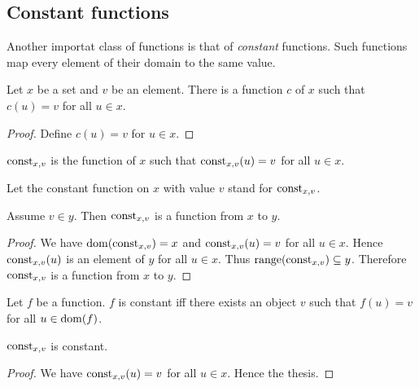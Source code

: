 \documentclass[../../set-theory.ftl.tex]{subfiles}
\begin{document}
  \subsection{Constant functions}

  Another importat class of functions is that of \textit{constant} functions.
  Such functions map every element of their domain to the same value.

  \begin{forthel}
    \begin{lemma}
      Let $x$ be a set and $v$ be an element.
      There is a function $c$ of $x$ such that $c(u) = v$ for all $u \in x$.
    \end{lemma}
    \begin{proof}
      Define $c(u) = v$ for $u \in x$.
    \end{proof}

    \begin{definition}
      $\mbox{const}_{x,v}$ is the function of $x$ such that $\mbox{const}_{x,v}(u) = v$ for all $u \in x$.
    \end{definition}

    Let the constant function on $x$ with value $v$ stand for $\mbox{const}_{x,v}$.

    \begin{proposition}\label{SetTheory_02_01_180417}
      Assume $v \in y$.
      Then $\mbox{const}_{x,v}$ is a function from $x$ to $y$.
    \end{proposition}
    \begin{proof}
      We have $\operatorname{dom}(\mbox{const}_{x,v}) = x$ and $\mbox{const}_{x,v}(u) = v$ for all $u \in x$.
      Hence $\mbox{const}_{x,v}(u)$ is an element of $y$ for all $u \in x$.
      Thus $\operatorname{range}(\mbox{const}_{x,v}) \subseteq y$.
      Therefore $\mbox{const}_{x,v}$ is a function from $x$ to $y$.
    \end{proof}

    \begin{definition}
      Let $f$ be a function.
      $f$ is constant iff there exists an object $v$ such that $f(u) = v$ for all $u \in \operatorname{dom}(f)$.
    \end{definition}

    \begin{proposition}\label{SetTheory_02_01_359618}
      $\mbox{const}_{x,v}$ is constant.
    \end{proposition}
    \begin{proof}
      We have $\mbox{const}_{x,v}(u) = v$ for all $u \in x$.
      Hence the thesis.
    \end{proof}
  \end{forthel}
\end{document}
